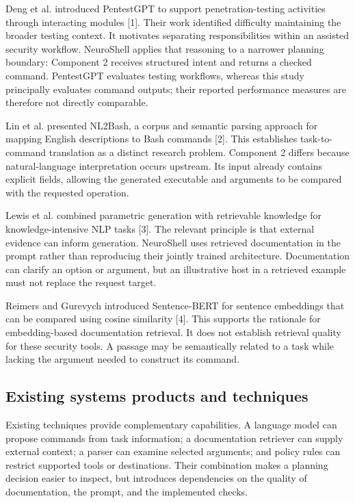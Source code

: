 \documentclass[
]{article}
\begin{document}
Deng et al. introduced PentestGPT to support penetration-testing
activities through interacting modules {[}1{]}. Their work identified
difficulty maintaining the broader testing context. It motivates
separating responsibilities within an assisted security workflow.
NeuroShell applies that reasoning to a narrower planning boundary:
Component 2 receives structured intent and returns a checked command.
PentestGPT evaluates testing workflows, whereas this study principally
evaluates command outputs; their reported performance measures are
therefore not directly comparable.

Lin et al. presented NL2Bash, a corpus and semantic parsing approach for
mapping English descriptions to Bash commands {[}2{]}. This establishes
task-to-command translation as a distinct research problem. Component 2
differs because natural-language interpretation occurs upstream. Its
input already contains explicit fields, allowing the generated
executable and arguments to be compared with the requested operation.

Lewis et al. combined parametric generation with retrievable knowledge
for knowledge-intensive NLP tasks {[}3{]}. The relevant principle is
that external evidence can inform generation. NeuroShell uses retrieved
documentation in the prompt rather than reproducing their jointly
trained architecture. Documentation can clarify an option or argument,
but an illustrative host in a retrieved example must not replace the
request target.

Reimers and Gurevych introduced Sentence-BERT for sentence embeddings
that can be compared using cosine similarity {[}4{]}. This supports the
rationale for embedding-based documentation retrieval. It does not
establish retrieval quality for these security tools. A passage may be
semantically related to a task while lacking the argument needed to
construct its command.

\hypertarget{existing-systems-products-and-techniques}{%
\subsection{Existing systems products and
techniques}\label{existing-systems-products-and-techniques}}

Existing techniques provide complementary capabilities. A language model
can propose commands from task information; a documentation retriever
can supply external context; a parser can examine selected arguments;
and policy rules can restrict supported tools or destinations. Their
combination makes a planning decision easier to inspect, but introduces
dependencies on the quality of documentation, the prompt, and the
implemented checks.
\end{document}
